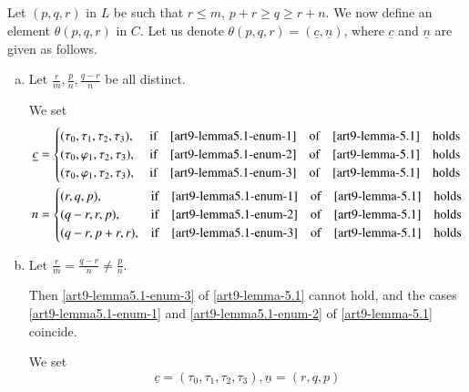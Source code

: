 \subsection{}\label{art9-subsec-5.2}
Let $(p, q,r)$ in $L$ be such that $ r \leq m$, $p + r \geq q \geq r +n$. We now define an element $\theta(p,q,r)$ in $C$. Let us denote $\theta(p,q,r) = (\underline{c}, \underline{n})$, where $\underline{c}$ and $\underline{n}$ are given as follows.
\begin{enumerate}[(a)]
\item  Let $\frac{r}{m}, \frac{p}{n}, \frac{q-r}{n}$ be all distinct.\label{art9-subsec5.2-enum-a}

We set
\begin{align*}
\underline{c} &=
\begin{cases}
(\tau_{0},\tau_{1},\tau_{2},\tau_{3}), & \text{ if}\quad  \eqref{art9-lemma5.1-enum-1}\quad \text{of} \quad\eqref{art9-lemma-5.1}\quad \text{holds}\\
(\tau_{0}, \varphi_{1}, \tau_{2}, \tau_{3}), & \text{ if}\quad  \eqref{art9-lemma5.1-enum-2}\quad \text{of} \quad\eqref{art9-lemma-5.1}\quad \text{holds}\\ 
(\tau_{0}, \varphi_{1}, \tau_{2}, \tau_{3}), & \text{ if}\quad  \eqref{art9-lemma5.1-enum-3}\quad \text{of} \quad\eqref{art9-lemma-5.1}\quad \text{holds}
\end{cases}\\
n &=
\begin{cases}
(r,q, p),  &\text{if} \quad  \eqref{art9-lemma5.1-enum-1}\quad \text{of} \quad\eqref{art9-lemma-5.1}\quad \text{holds}\\
(q-r,r,p), & \text{if} \quad  \eqref{art9-lemma5.1-enum-2}\quad \text{of} \quad\eqref{art9-lemma-5.1}\quad \text{holds}\\
(q-r, p+r, r), & \text{if} \quad  \eqref{art9-lemma5.1-enum-3}\quad \text{of} \quad\eqref{art9-lemma-5.1}\quad \text{holds}
\end{cases}
\end{align*}

\item Let $\frac{r}{m} = \frac{q-r}{n} \neq \frac{p}{n}$.\label{art9-subsec5.2-enum-b}

Then \eqref{art9-lemma5.1-enum-3} of \ref{art9-lemma-5.1} cannot hold, and the cases \eqref{art9-lemma5.1-enum-1} and
\eqref{art9-lemma5.1-enum-2} of \ref{art9-lemma-5.1} coincide.

We set
$$
\underline{c}=(\tau_{0}, \tau_{1}, \tau_{2}, \tau_{3}), \underline{n}= (r, q, p)
$$


\end{enumerate}

